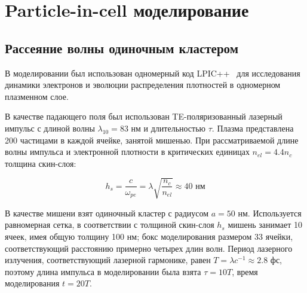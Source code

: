 \section{Particle-in-cell моделирование}

\subsection{Рассеяние волны одиночным кластером}

В моделировании был использован одномерный код LPIC++~\cite{Pfund1998} для исследования динамики электронов и эволюции распределения плотностей в одномерном плазменном слое.

В качестве падающего поля был использован TE-поляризованный лазерный импульс с длиной волны $\lambda_{10} = 83$ нм и длительностью $\tau$. Плазма представлена 200 частицами в каждой ячейке, занятой мишенью. При рассматриваемой длине волны импульса и электронной плотности в критических единицах $n_{el} = 4.4 n_c$ толщина скин-слоя:

    \begin{equation}
        h_{s} = \frac{c}{\omega_{pe}} = \lambda\sqrt{\frac{n_c}{n_{el}}} \approx40 \textrm{ нм} 
        \label{pic_skin_single}
    \end{equation}

В качестве мишени взят одиночный кластер с радиусом $a = 50$ нм. Используется равномерная сетка, в соответствии с толщиной скин-слоя $h_{s}$ мишень занимает 10 ячеек, имея общую толщину 100 нм; бокс моделирования размером 33 ячейки, соответствующий расстоянию примерно четырех длин волн. Период лазерного излучения, соответствующий лазерной гармонике, равен $T = \lambda c^{-1} \approx 2.8$ фс, поэтому длина импульса в моделировании была взята $\tau = 10T$, время моделирования $t = 20T$. 

    \begin{figure}[H]
        \label{lpic_low_high:image}
    \end{figure}

